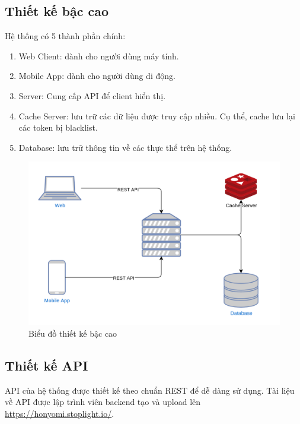 \documentclass[./../main.tex]{subfiles}
\begin{document}
\subsection{Thiết kế bậc cao}

Hệ thống có 5 thành phần chính:
\begin{enumerate}
	\item Web Client: dành cho người dùng máy tính.
	\item Mobile App: dành cho người dùng di động.
	\item Server: Cung cấp API để client hiển thị.
	\item Cache Server: lưu trữ các dữ liệu được truy cập nhiều. Cụ thể, cache lưu lại các token bị blacklist.
	\item Database: lưu trữ thông tin về các thực thể trên hệ thống.
\end{enumerate}

\begin{figure}[H]
	\centering
	\includegraphics[width=\linewidth]{./images/high_level_diagram.png}
	\caption{Biểu đồ thiết kế bậc cao}
\end{figure}

\subsection{Thiết kế API}

API của hệ thống được thiết kế theo chuẩn REST để dễ dàng sử dụng. Tài liệu về API được lập trình viên backend tạo và upload lên \url{https://honyomi.stoplight.io/}.
\end{document}
